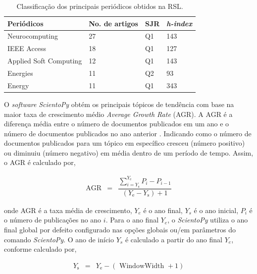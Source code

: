 \begin{table}[!htb]
	\centering
	\caption{Classificação dos principais periódicos obtidos na RSL.}\label{tb2}
	
	\begin{tabular}{llll}		
		\toprule
		Periódicos      & No. de artigos & SJR & \textit{h-index} \\\midrule
		Neurocomputing         & 27                         & Q1                     & 143     \\
		IEEE Access            & 18                         & Q1                     & 127     \\
		Applied Soft Computing & 12                         & Q1                     & 143     \\
		Energies               & 11                         & Q2                     & 93      \\
		Energy                 & 11                         & Q1                     & 343     \\ \bottomrule
	\end{tabular}
\end{table}

O \textit{software} \textit{ScientoPy} obtém os principais tópicos de tendência com base na maior taxa de crescimento médio \textit{Average Growth Rate} (AGR). A AGR é a diferença média entre o número de documentos publicados em um ano e o número de documentos publicados no ano anterior \cite{scientopy}. Indicando como o número de documentos publicados para um tópico em específico cresceu (número positivo) ou diminuiu (número negativo) em média dentro de um período de tempo. Assim, o AGR é calculado por,

\begin{eqnarray}
	\mathrm{AGR}&=&\dfrac{\sum_{i=Y_{\mathrm{s}}}^{Y_{\mathrm{e}}} P_i-P_{i-1}}{\left(Y_{\mathrm{e}}-Y_{\mathrm{s}}\right)+1} \label{arg}
\end{eqnarray}

\noindent onde AGR é a taxa média de crescimento, $Y_e$ é o ano final, $Y_s$ é o ano inicial, $P_i$ é o número de publicações no ano $i$. Para o ano final $Y_e$, o \textit{ScientoPy} utiliza o ano final global por defeito configurado nas opções globais ou/em parâmetros do comando \textit{ScientoPy}. O ano de início $Y_s$ é calculado a partir do ano final $Y_e$, conforme calculado por,

\begin{eqnarray}
	Y_{\mathrm{s}}&=&Y_{\mathrm{e}}-(\text { WindowWidth }+1)\label{arg2}
\end{eqnarray}

